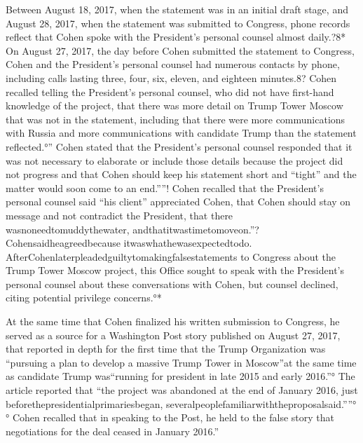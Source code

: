 Between August 18, 2017, when the statement was in an initial draft stage, and August 28, 2017, when the statement was submitted to Congress, phone records reflect that Cohen spoke with the President's personal counsel almost daily.?8*
On August 27, 2017, the day before Cohen submitted the statement to Congress, Cohen and the President's personal counsel had numerous contacts by phone, including calls lasting three, four, six, eleven, and eighteen minutes.8?
Cohen recalled telling the President's personal counsel, who did not have first-hand knowledge of the project, that there was more detail on Trump Tower Moscow that was not in the statement, including that there were more communications with Russia and more communications with candidate Trump than the statement reflected.°”
Cohen stated that the President's personal counsel responded that it was not necessary to elaborate or include those details because the project did not progress and that Cohen should keep his statement short and “tight” and the matter would soon come to an end.””!
Cohen recalled that the President's personal counsel said “his client” appreciated Cohen, that Cohen should stay on message and not contradict the President, that there wasnoneedtomuddythewater, andthatitwastimetomoveon.”?
Cohensaidheagreedbecause itwaswhathewasexpectedtodo.
AfterCohenlaterpleadedguiltytomakingfalsestatements to Congress about the Trump Tower Moscow project, this Office sought to speak with the President's personal counsel about these conversations with Cohen, but counsel declined, citing potential privilege concerns.°*

At the same time that Cohen finalized his written submission to Congress, he served as a source for a Washington Post story published on August 27, 2017, that reported in depth for the first time that the Trump Organization was “pursuing a plan to develop a massive Trump Tower in Moscow”at the same time as candidate Trump was“running for president in late 2015 and early 2016.”°
The article reported that “the project was abandoned at the end of January 2016, just beforethepresidentialprimariesbegan, severalpeoplefamiliarwiththeproposalsaid.””°°
Cohen recalled that in speaking to the Post, he held to the false story that negotiations for the deal ceased in January 2016.”

